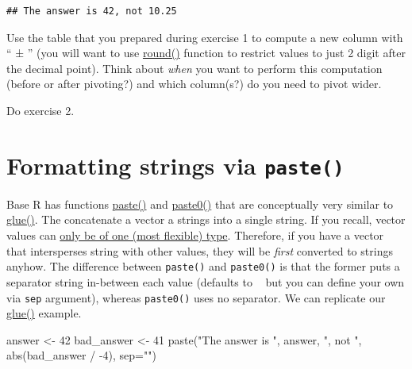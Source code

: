 \documentclass[
]{book}
\newenvironment{Shaded}{\begin{snugshade}}{\end{snugshade}}
\newcommand{\AttributeTok}[1]{\textcolor[rgb]{0.77,0.63,0.00}{#1}}
\newcommand{\DecValTok}[1]{\textcolor[rgb]{0.00,0.00,0.81}{#1}}
\newcommand{\FunctionTok}[1]{\textcolor[rgb]{0.00,0.00,0.00}{#1}}
\newcommand{\NormalTok}[1]{#1}
\newcommand{\OtherTok}[1]{\textcolor[rgb]{0.56,0.35,0.01}{#1}}
\newcommand{\SpecialCharTok}[1]{\textcolor[rgb]{0.00,0.00,0.00}{#1}}
\newcommand{\StringTok}[1]{\textcolor[rgb]{0.31,0.60,0.02}{#1}}
\begin{document}
\begin{verbatim}
## The answer is 42, not 10.25
\end{verbatim}

Use the table that you prepared during exercise 1 to compute a new column with `` ± '' (you will want to use \href{https://stat.ethz.ch/R-manual/R-devel/library/base/html/Round.html}{round()} function to restrict values to just 2 digit after the decimal point). Think about \emph{when} you want to perform this computation (before or after pivoting?) and which column(s?) do you need to pivot wider.

Do exercise 2.

\hypertarget{paste}{%
\section{\texorpdfstring{Formatting strings via \texttt{paste()}}{Formatting strings via paste()}}\label{paste}}

Base R has functions \href{https://stat.ethz.ch/R-manual/R-devel/library/base/html/paste.html}{paste()} and \href{https://stat.ethz.ch/R-manual/R-devel/library/base/html/paste.html}{paste0()} that are conceptually very similar to \href{https://glue.tidyverse.org/reference/glue.html}{glue()}. The concatenate a vector a strings into a single string. If you recall, vector values can \protect\hyperlink{vectors-are-homogeneous}{only be of one (most flexible) type}. Therefore, if you have a vector that intersperses string with other values, they will be \emph{first} converted to strings anyhow. The difference between \texttt{paste()} and \texttt{paste0()} is that the former puts a separator string in-between each value (defaults to \texttt{\textquotesingle{}\ \textquotesingle{}} but you can define your own via \texttt{sep} argument), whereas \texttt{paste0()} uses no separator. We can replicate our \href{https://glue.tidyverse.org/reference/glue.html}{glue()} example.

\begin{Shaded}
\begin{Highlighting}[]
\NormalTok{answer }\OtherTok{\textless{}{-}} \DecValTok{42}
\NormalTok{bad\_answer }\OtherTok{\textless{}{-}} \DecValTok{41}
\FunctionTok{paste}\NormalTok{(}\StringTok{"The answer is "}\NormalTok{, answer, }\StringTok{", not "}\NormalTok{, }\FunctionTok{abs}\NormalTok{(bad\_answer }\SpecialCharTok{/} \SpecialCharTok{{-}}\DecValTok{4}\NormalTok{), }\AttributeTok{sep=}\StringTok{""}\NormalTok{)}
\end{Highlighting}
\end{Shaded}
\end{document}
